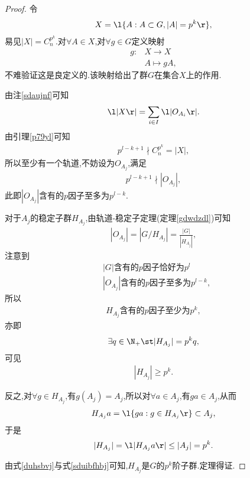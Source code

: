 \begin{proof}
    令\begin{align*}
        X=\l\{A:A\subset G,|A|=p^k\r\},
    \end{align*}易见$|X|=C_{n}^{p^k}$.对$\forall A\in X$,对$\forall g\in G$定义映射\begin{align*}
        g:&X\to X\\
        &A\mapsto gA,
    \end{align*}不难验证这是良定义的.该映射给出了群$G$在集合$X$上的作用.

    由注\ref{sdaujnf}可知\begin{align*}
        \l|X\r|=\sum_{i\in I}\l|O_{A_i}\r|.
    \end{align*}由引理\ref{p79yl}可知\begin{align*}
        p^{l-k+1}\nmid C_n^{p^k}=|X|,
    \end{align*}所以至少有一个轨道,不妨设为$O_{A_j}$,满足\begin{align*}
        p^{l-k+1}\nmid|O_{A_j}|,
    \end{align*}此即$|O_{A_j}|$含有的$p$因子至多为$p^{l-k}$.
    
    对于$A_j$的稳定子群$H_{A_j}$,由轨道-稳定子定理(定理\ref{gdwdzdl})可知\begin{align*}
        |O_{A_j}|=|G/H_{A_j}|=\frac{|G|}{|H_{A_j}|},
    \end{align*}注意到\begin{align*}
        &\text{$|G|$含有的$p$因子恰好为$p^l$}\\
        &\text{$|O_{A_j}|$含有的$p$因子至多为$p^{l-k}$},
    \end{align*}所以\begin{align*}
        \text{$H_{A_j}$含有的$p$因子至少为$p^k$},
    \end{align*}亦即\begin{align*}
        \exists q\in\N_+\st|H_{A_j}|=p^kq,
    \end{align*}可见\begin{align}\label{duhsbvj}
        |H_{A_j}|\geq p^k.
    \end{align}

    反之,对$\forall g\in H_{A_j}$,有$g(A_j)=A_j$,所以对$\forall a\in A_j$,有$ga\in A_j$,从而\begin{align*}
        H_{A_j}a=\l\{ga:g\in H_{A_j}\r\}\subset A_j,
    \end{align*}于是\begin{align}\label{sduibfhbj}
        |H_{A_j}|=\l|H_{A_j}a\r|\leq|A_j|=p^k.
    \end{align}

    由式\eqref{duhsbvj}与式\eqref{sduibfhbj}可知,$H_{A_j}$是$G$的$p^k$阶子群.定理得证.
\end{proof}
